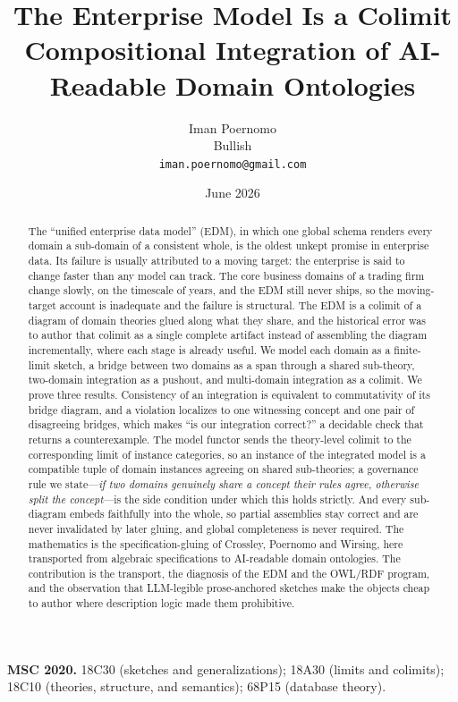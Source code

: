 \documentclass[11pt]{article}
\title{\textbf{The Enterprise Model Is a Colimit}\\[0.3em]
\large Compositional Integration of AI-Readable Domain Ontologies}
\author{Iman Poernomo\\[0.25em]\normalsize Bullish\\[0.1em]\normalsize\texttt{iman.poernomo@gmail.com}}
\date{June 2026}
\theoremstyle{plain}
\theoremstyle{definition}
\begin{document}
\maketitle

\begin{abstract}
The ``unified enterprise data model'' (EDM), in which one global schema renders every domain a sub-domain of a consistent whole, is the oldest unkept promise in enterprise data. Its failure is usually attributed to a moving target: the enterprise is said to change faster than any model can track. The core business domains of a trading firm change slowly, on the timescale of years, and the EDM still never ships, so the moving-target account is inadequate and the failure is structural. The EDM is a colimit of a diagram of domain theories glued along what they share, and the historical error was to author that colimit as a single complete artifact instead of assembling the diagram incrementally, where each stage is already useful. We model each domain as a finite-limit sketch, a bridge between two domains as a span through a shared sub-theory, two-domain integration as a pushout, and multi-domain integration as a colimit. We prove three results. Consistency of an integration is equivalent to commutativity of its bridge diagram, and a violation localizes to one witnessing concept and one pair of disagreeing bridges, which makes ``is our integration correct?'' a decidable check that returns a counterexample. The model functor sends the theory-level colimit to the corresponding limit of instance categories, so an instance of the integrated model is a compatible tuple of domain instances agreeing on shared sub-theories; a governance rule we state---\emph{if two domains genuinely share a concept their rules agree, otherwise split the concept}---is the side condition under which this holds strictly. And every sub-diagram embeds faithfully into the whole, so partial assemblies stay correct and are never invalidated by later gluing, and global completeness is never required. The mathematics is the specification-gluing of Crossley, Poernomo and Wirsing, here transported from algebraic specifications to AI-readable domain ontologies. The contribution is the transport, the diagnosis of the EDM and the OWL/RDF program, and the observation that LLM-legible prose-anchored sketches make the objects cheap to author where description logic made them prohibitive.
\end{abstract}

\medskip
\noindent\textbf{MSC 2020.} 18C30 (sketches and generalizations); 18A30 (limits and colimits); 18C10 (theories, structure, and semantics); 68P15 (database theory).
\end{document}
